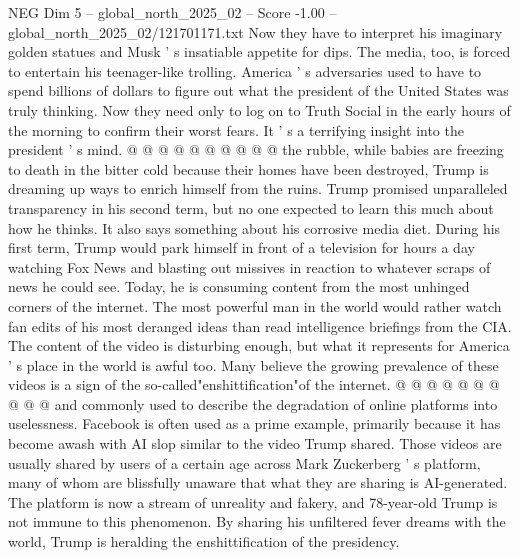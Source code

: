 \begin{textsample}{NEG Dim 5 – global\_north\_2025\_02 – Score -1.00 – global\_north\_2025\_02/121701171.txt}
Now they have to interpret his imaginary golden statues and Musk ' s insatiable appetite for dips.
The media, too, is forced to entertain his teenager-like trolling.
America ' s adversaries used to have to spend billions of dollars to figure out what the president of the United States was truly thinking.
Now they need only to log on to Truth Social in the early hours of the morning to confirm their worst fears.
It ' s a terrifying insight into the president ' s mind. @ @ @ @ @ @ @ @ @ @ the rubble, while babies are freezing to death in the bitter cold because their homes have been destroyed, Trump is dreaming up ways to enrich himself from the ruins.
Trump promised unparalleled transparency in his second term, but no one expected to learn this much about how he thinks.
It also says something about his corrosive media diet.
During his first term, Trump would park himself in front of a television for hours a day watching Fox News and blasting out missives in reaction to whatever scraps of news he could see.
Today, he is consuming content from the most unhinged corners of the internet.
The most powerful man in the world would rather watch fan edits of his most deranged ideas than read intelligence briefings from the CIA.
The content of the video is disturbing enough, but what it represents for America ' s place in the world is awful too.
Many believe the growing prevalence of these videos is a sign of the so-called"enshittification"of the internet. @ @ @ @ @ @ @ @ @ @ and commonly used to describe the degradation of online platforms into uselessness.
Facebook is often used as a prime example, primarily because it has become awash with AI slop similar to the video Trump shared.
Those videos are usually shared by users of a certain age across Mark Zuckerberg ' s platform, many of whom are blissfully unaware that what they are sharing is AI-generated.
The platform is now a stream of unreality and fakery, and 78-year-old Trump is not immune to this phenomenon.
By sharing his unfiltered fever dreams with the world, Trump is heralding the enshittification of the presidency.

\end{textsample}
